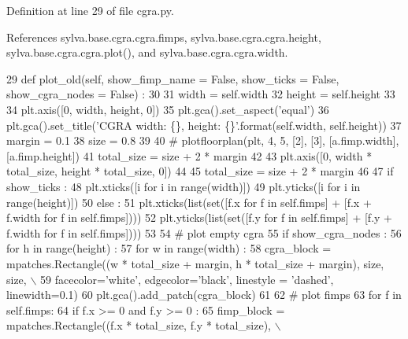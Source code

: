 Definition at line 29 of file cgra.\+py.



References sylva.\+base.\+cgra.\+cgra.\+fimps, sylva.\+base.\+cgra.\+cgra.\+height, sylva.\+base.\+cgra.\+cgra.\+plot(), and sylva.\+base.\+cgra.\+cgra.\+width.


\begin{DoxyCode}
29   \textcolor{keyword}{def }plot\_old(self, show\_fimp\_name = False, show\_ticks = False, show\_cgra\_nodes = False) :
30 
31     width = self.width
32     height = self.height
33 
34     plt.axis([0, width, height, 0])
35     plt.gca().set\_aspect(\textcolor{stringliteral}{'equal'})
36     plt.gca().set\_title(\textcolor{stringliteral}{'CGRA width: \{\}, height: \{\}'}.format(self.width, self.height))
37     margin = 0.1
38     size = 0.8
39 
40     \textcolor{comment}{# plotfloorplan(plt, 4, 5, [2], [3], [a.fimp.width], [a.fimp.height])}
41     total\_size = size + 2 * margin
42 
43     plt.axis([0, width * total\_size, height * total\_size, 0])
44 
45     total\_size = size + 2 * margin
46 
47     \textcolor{keywordflow}{if} show\_ticks :
48       plt.xticks([i \textcolor{keywordflow}{for} i \textcolor{keywordflow}{in} range(width)])
49       plt.yticks([i \textcolor{keywordflow}{for} i \textcolor{keywordflow}{in} range(height)])
50     \textcolor{keywordflow}{else} :
51       plt.xticks(list(set([f.x \textcolor{keywordflow}{for} f \textcolor{keywordflow}{in} self.fimps] + [f.x + f.width \textcolor{keywordflow}{for} f \textcolor{keywordflow}{in} self.fimps])))
52       plt.yticks(list(set([f.y \textcolor{keywordflow}{for} f \textcolor{keywordflow}{in} self.fimps] + [f.y + f.width \textcolor{keywordflow}{for} f \textcolor{keywordflow}{in} self.fimps])))
53 
54     \textcolor{comment}{# plot empty cgra}
55     \textcolor{keywordflow}{if} show\_cgra\_nodes :
56       \textcolor{keywordflow}{for} h \textcolor{keywordflow}{in} range(height) :
57         \textcolor{keywordflow}{for} w \textcolor{keywordflow}{in} range(width) :
58           cgra\_block = mpatches.Rectangle((w * total\_size + margin, h * total\_size + margin), size, size, \(\backslash\)
59             facecolor=\textcolor{stringliteral}{'white'}, edgecolor=\textcolor{stringliteral}{'black'}, linestyle = \textcolor{stringliteral}{'dashed'}, linewidth=0.1)
60           plt.gca().add\_patch(cgra\_block)
61 
62     \textcolor{comment}{# plot fimps}
63     \textcolor{keywordflow}{for} f \textcolor{keywordflow}{in} self.fimps:
64       \textcolor{keywordflow}{if} f.x >= 0 \textcolor{keywordflow}{and} f.y >= 0 :
65         fimp\_block = mpatches.Rectangle((f.x * total\_size, f.y * total\_size), \(\backslash\)

\end{DoxyCode}
